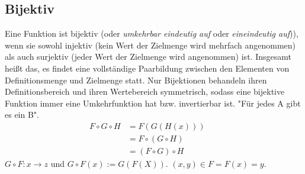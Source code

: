 \subsection{Bijektiv}
Eine Funktion ist bijektiv (oder \emph{umkehrbar eindeutig auf} oder
    \emph{eineindeutig auf})), wenn sie sowohl injektiv (kein Wert der
    Zielmenge wird mehrfach angenommen) als auch surjektiv (jeder Wert der
    Zielmenge wird angenommen) ist. Insgesamt heißt das, es findet eine
    vollständige Paarbildung zwischen den Elementen von Definitionsmenge
    und Zielmenge statt. Nur Bijektionen behandeln ihren Definitionsbereich
    und ihren Wertebereich symmetrisch, sodass eine bijektive Funktion
    immer eine Umkehrfunktion hat bzw. invertierbar ist. "Für jedes A gibt
    es ein B".
\begin{align*}
	F \circ G \circ H &= F(G(H(x))) &&\\
	&= F \circ (G \circ H) &&\\
	&= (F \circ G) \circ H &&
\end{align*}
\(G\circ F: x \rightarrow z\) und \(G \circ F(x):= G(F(X))\).\newline
\((x,y) \in F = F(x)=y\).